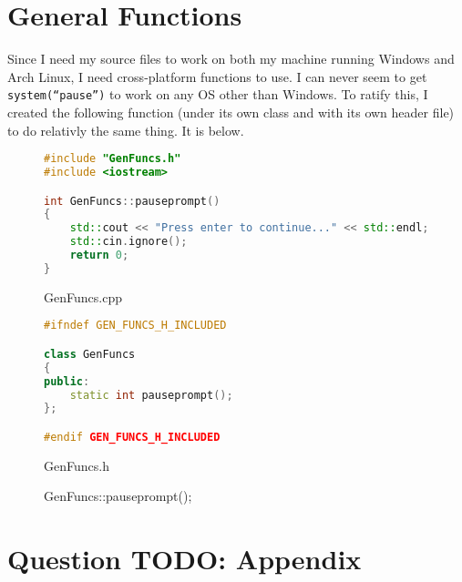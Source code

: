\documentclass[a4paper]{article}
\begin{document}
    \section{General Functions}
      Since I need my source files to work on both my machine running Windows and
        Arch Linux, I need cross-platform functions to use. I can never seem to
        get \texttt{system(``pause'')} to work on any OS other than Windows. To
        ratify this, I created the following function (under its own class
        and with its own header file) to do relativly the same thing. It is below.
        \begin{figure}[h]
          \caption{GenFuncs.cpp}
          \begin{lstlisting}[language=c++]
#include "GenFuncs.h"
#include <iostream>

int GenFuncs::pauseprompt()
{
    std::cout << "Press enter to continue..." << std::endl;
    std::cin.ignore();
    return 0;
}
          \end{lstlisting}
        \end{figure}
        \begin{figure}[h]
          \caption{GenFuncs.h}
          \begin{lstlisting}[language=c++]
#ifndef GEN_FUNCS_H_INCLUDED

class GenFuncs
{
public:
    static int pauseprompt();
};

#endif GEN_FUNCS_H_INCLUDED
          \end{lstlisting}
        \end{figure}
        \begin{figure}[h]
          \caption{GenFuncs::pauseprompt();}
          \centering
        \end{figure}


    \newpage
    \section{Question TODO: Appendix}



  
\end{document}
